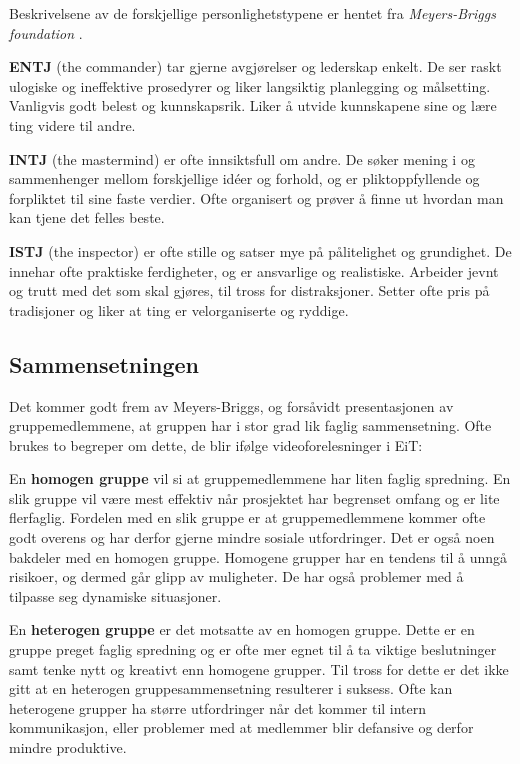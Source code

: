 Beskrivelsene av de forskjellige personlighetstypene er hentet fra \textit{Meyers-Briggs foundation} \citep{mbtypes}.
\vspace{\secspace}

\textbf{ENTJ} (the commander) tar gjerne avgjørelser og lederskap enkelt. 
De ser raskt ulogiske og ineffektive prosedyrer og liker langsiktig planlegging og målsetting. 
Vanligvis godt belest og kunnskapsrik. 
Liker å utvide kunnskapene sine og lære ting videre til andre. 

\textbf{INTJ} (the mastermind) er ofte innsiktsfull om andre. 
De søker mening i og sammenhenger mellom forskjellige idéer og forhold, og er pliktoppfyllende og forpliktet til sine faste verdier. 
Ofte organisert og prøver å finne ut hvordan man kan tjene det felles beste. 

\textbf{ISTJ} (the inspector) er ofte stille og satser mye på pålitelighet og grundighet. 
De innehar ofte praktiske ferdigheter, og er ansvarlige og realistiske. 
Arbeider jevnt og trutt med det som skal gjøres, til tross for distraksjoner. 
Setter ofte pris på tradisjoner og liker at ting er velorganiserte og ryddige. 

\subsection{Sammensetningen}
Det kommer godt frem av Meyers-Briggs, og forsåvidt presentasjonen av gruppemedlemmene, at gruppen har i stor grad lik faglig sammensetning.
Ofte brukes to begreper om dette, de blir ifølge videoforelesninger\citep{video} i EiT: 
\vspace{\secspace}

En \textbf{homogen gruppe} vil si at gruppemedlemmene har liten faglig spredning. 
En slik gruppe vil være mest effektiv når prosjektet har begrenset omfang og er lite flerfaglig. 
Fordelen med en slik gruppe er at gruppemedlemmene kommer ofte godt overens og har derfor gjerne mindre sosiale utfordringer. 
Det er også noen bakdeler med en homogen gruppe. 
Homogene grupper har en tendens til å unngå risikoer, og dermed går glipp av muligheter. 
De har også problemer med å tilpasse seg dynamiske situasjoner.
\vspace{\secspace}

En \textbf{heterogen gruppe} er det motsatte av en homogen gruppe. 
Dette er en gruppe preget faglig spredning og er ofte mer egnet til å ta viktige beslutninger samt tenke nytt og kreativt enn homogene grupper. 
Til tross for dette er det ikke gitt at en heterogen gruppesammensetning resulterer i suksess. 
Ofte kan heterogene grupper ha større utfordringer når det kommer til intern kommunikasjon, eller problemer med at medlemmer blir defansive og derfor mindre produktive. 
\vspace{\secspace}
